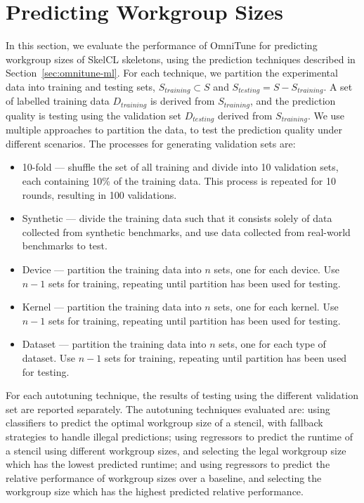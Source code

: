 \section{Predicting Workgroup Sizes}

In this section, we evaluate the performance of OmniTune for
predicting workgroup sizes of SkelCL skeletons, using the prediction
techniques described in Section~\ref{sec:omnitune-ml}. For each
technique, we partition the experimental data into training and
testing sets, $S_{training} \subset S$ and
$S_{testing} = S - S_{training}$. A set of labelled training data
$D_{training}$ is derived from $S_{training}$, and the prediction
quality is testing using the validation set $D_{testing}$ derived from
$S_{training}$. We use multiple approaches to partition the data, to
test the prediction quality under different scenarios. The processes
for generating validation sets are:
%
\begin{itemize}
\item 10-fold --- shuffle the set of all training and divide into 10
  validation sets, each containing 10\% of the training data. This
  process is repeated for 10 rounds, resulting in 100 validations.
\item Synthetic --- divide the training data such that it consists
  solely of data collected from synthetic benchmarks, and use data
  collected from real-world benchmarks to test.
\item Device --- partition the training data into $n$ sets, one for
  each device. Use $n-1$ sets for training, repeating until partition
  has been used for testing.
\item Kernel --- partition the training data into $n$ sets, one for
  each kernel. Use $n-1$ sets for training, repeating until partition
  has been used for testing.
\item Dataset --- partition the training data into $n$ sets, one for
  each type of dataset. Use $n-1$ sets for training, repeating until
  partition has been used for testing.
\end{itemize}
%
For each autotuning technique, the results of testing using the
different validation set are reported separately. The autotuning
techniques evaluated are: using classifiers to predict the optimal
workgroup size of a stencil, with fallback strategies to handle
illegal predictions; using regressors to predict the runtime of a
stencil using different workgroup sizes, and selecting the legal
workgroup size which has the lowest predicted runtime; and using
regressors to predict the relative performance of workgroup sizes over
a baseline, and selecting the workgroup size which has the highest
predicted relative performance.


